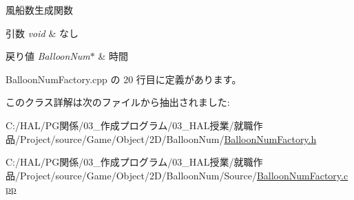 風船数生成関数 


\begin{DoxyParams}{引数}
{\em void} & なし \\
\hline
\end{DoxyParams}

\begin{DoxyRetVals}{戻り値}
{\em Balloon\+Num$\ast$} & 時間 \\
\hline
\end{DoxyRetVals}


 Balloon\+Num\+Factory.\+cpp の 20 行目に定義があります。



このクラス詳解は次のファイルから抽出されました\+:\begin{DoxyCompactItemize}
\item 
C\+:/\+H\+A\+L/\+P\+G関係/03\+\_\+作成プログラム/03\+\_\+\+H\+A\+L授業/就職作品/\+Project/source/\+Game/\+Object/2\+D/\+Balloon\+Num/\mbox{\hyperlink{_balloon_num_factory_8h}{Balloon\+Num\+Factory.\+h}}\item 
C\+:/\+H\+A\+L/\+P\+G関係/03\+\_\+作成プログラム/03\+\_\+\+H\+A\+L授業/就職作品/\+Project/source/\+Game/\+Object/2\+D/\+Balloon\+Num/\+Source/\mbox{\hyperlink{_balloon_num_factory_8cpp}{Balloon\+Num\+Factory.\+cpp}}\end{DoxyCompactItemize}

